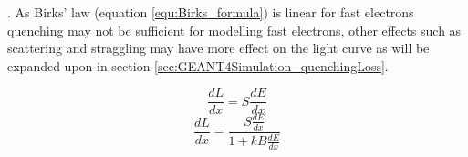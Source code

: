 \cite{craun_1970}. As Birks' law (equation \ref{equ:Birks_formula}) is linear for fast electrons \cite{knoll_2010} quenching may not be sufficient for modelling fast electrons, other effects such as scattering and straggling may have more effect on the light curve as will be expanded upon in section \ref{sec:GEANT4Simulation_quenchingLoss}. 

\begin{equation}
\frac{dL}{dx} = S\frac{dE}{dx}
\label{equ:light_yield_proportional}
\end{equation}
\begin{equation}
\frac{dL}{dx} = \frac{S\frac{dE}{dx}}{1 + kB \frac{dE}{dx}}
\label{equ:Birks_formula}
\end{equation}

